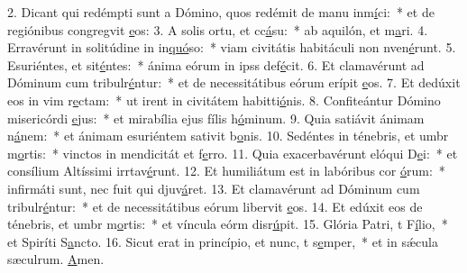 2. Dicant qui redémpti sunt a Dómino, quos redémit de manu inm\uline{í}ci:~* et de regiónibus congregvit \uline{e}os:
3. A solis ortu, et cc\uline{á}su:~* ab aquilón, et m\uline{a}ri.
4. Erravérunt in solitúdine in in\uline{quó}so:~* viam civitátis habitáculi non nven\uline{é}runt.
5. Esuriéntes, et sit\uline{é}ntes:~* ánima eórum in ipss def\uline{é}cit.
6. Et clamavérunt ad Dóminum cum tribulr\uline{é}ntur:~* et de necessitátibus eórum erípit \uline{e}os.
7. Et dedúxit eos in vim r\uline{e}ctam:~* ut irent in civitátem habitti\uline{ó}nis.
8. Confiteántur Dómino misericórdi \uline{e}jus:~* et mirabília ejus fílis h\uline{ó}minum.
9. Quia satiávit ánimam n\uline{á}nem:~* et ánimam esuriéntem sativit b\uline{o}nis.
10. Sedéntes in ténebris, et umbr m\uline{o}rtis:~* vinctos in mendicitát et f\uline{e}rro.
11. Quia exacerbavérunt elóqui D\uline{e}i:~* et consílium Altíssimi irrtav\uline{é}runt.
12. Et humiliátum est in labóribus cor \uline{ó}rum:~* infirmáti sunt, nec fuit qui djuv\uline{á}ret.
13. Et clamavérunt ad Dóminum cum tribulr\uline{é}ntur:~* et de necessitátibus eórum libervit \uline{e}os.
14. Et edúxit eos de ténebris, et umbr m\uline{o}rtis:~* et víncula eórm disr\uline{ú}pit.
15. Glória Patri, t F\uline{í}lio,~* et Spiríti S\uline{a}ncto.
16. Sicut erat in princípio, et nunc, t s\uline{e}mper,~* et in sǽcula sæculrum. \uline{A}men.

